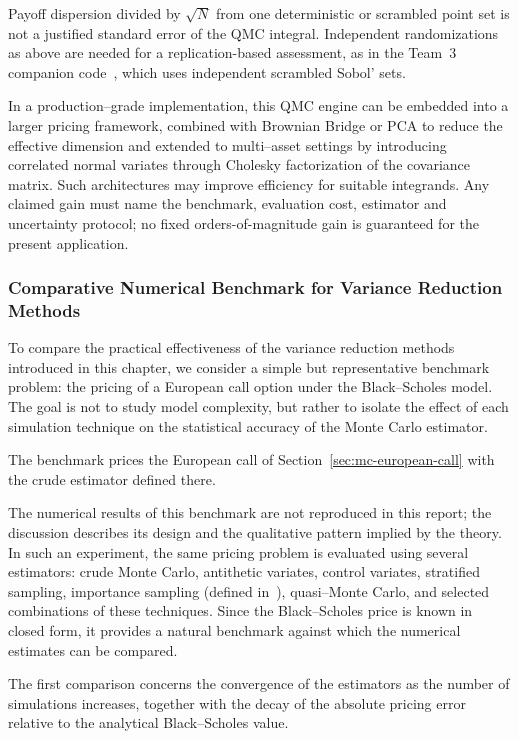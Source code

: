Payoff dispersion divided by $\sqrt N$ from one deterministic or
scrambled point set is not a justified standard error of the QMC
integral. Independent randomizations as above are needed for a
replication-based assessment, as in the Team~3 companion code~\cite{team3}, which uses independent scrambled Sobol' sets.




In a production--grade implementation, this QMC engine can be embedded into a larger pricing framework, combined with Brownian Bridge or PCA to reduce the effective dimension and extended to multi--asset settings by introducing correlated normal variates through Cholesky factorization of the covariance matrix.  
Such architectures may improve efficiency for suitable integrands.
Any claimed gain must name the benchmark, evaluation cost, estimator
and uncertainty protocol; no fixed orders-of-magnitude gain is
guaranteed for the present application.
\subsubsection{Comparative Numerical Benchmark for Variance Reduction Methods}


To compare the practical effectiveness of the variance reduction methods introduced in this chapter, we consider a simple but representative benchmark problem: the pricing of a European call option under the Black--Scholes model. The goal is not to study model complexity, but rather to isolate the effect of each simulation technique on the statistical accuracy of the Monte Carlo estimator.

The benchmark prices the European call of Section~\ref{sec:mc-european-call} with the crude estimator defined there.

The numerical results of this benchmark are not reproduced in this report; the discussion describes its design and the qualitative pattern implied by the theory. In such an experiment, the same pricing problem is evaluated using several estimators: crude Monte Carlo, antithetic variates, control variates, stratified sampling, importance sampling (defined in~\cite{team3}), quasi--Monte Carlo, and selected combinations of these techniques. Since the Black--Scholes price is known in closed form, it provides a natural benchmark against which the numerical estimates can be compared.

The first comparison concerns the convergence of the estimators as the number of simulations increases, together with the decay of the absolute pricing error relative to the analytical Black--Scholes value.



